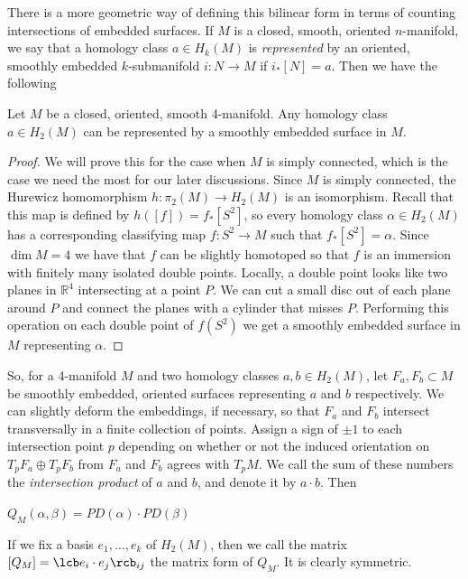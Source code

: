 There is a more geometric way of defining this bilinear form in terms of counting intersections of embedded surfaces. If $M$ is a closed, smooth, oriented $n$-manifold, we say that a homology class $a \in H_k(M)$ is \emph{represented} by an oriented, smoothly embedded $k$-submanifold $i : N \rightarrow M$ if $i_*[N] = a$. Then we have the following
\begin{lem}
\label{2nd homology classes represented by surfaces}
Let $M$ be a closed, oriented, smooth 4-manifold. Any homology class $a \in H_2(M)$ can be represented by a smoothly embedded surface in $M$.
\end{lem}
\begin{proof}
We will prove this for the case when $M$ is simply connected, which is the case we need the most for our later discussions. Since $M$ is simply connected, the Hurewicz homomorphism $h : \pi_2(M) \rightarrow H_2(M)$ is an isomorphism. Recall that this map is defined by $h([f]) = f_*[S^2]$, so every homology class $\alpha \in H_2(M)$ has a corresponding classifying map $f : S^2 \rightarrow M$ such that $f_*[S^2] = \alpha$. Since $\dim M = 4$ we have that $f$ can be slightly homotoped so that $f$ is an immersion with finitely many isolated double points. Locally, a double point looks like two planes in $\mathbb R^4$ intersecting at a point $P$. We can cut a small disc out of each plane around $P$ and connect the planes with a cylinder that misses $P$. Performing this operation on each double point of $f(S^2)$ we get a smoothly embedded surface in $M$ representing $\alpha$.
\end{proof}


So, for a 4-manifold $M$ and two homology classes $a,b \in H_2(M)$, let $F_a,F_b \subset M$ be smoothly embedded, oriented surfaces representing $a$ and $b$ respectively. We can slightly deform the embeddings, if necessary, so that $F_a$ and $F_b$ intersect transversally in a finite collection of points. Assign a sign of $\pm 1$ to each intersection point $p$ depending on whether or not the induced orientation on $T_p F_a \oplus T_p F_b$ from $F_a$ and $F_b$ agrees with $T_p M$. We call the sum of these numbers the \emph{intersection product} of $a$ and $b$, and denote it by $a \cdot b$. Then
\begin{prop}
$Q_M(\alpha,\beta) = PD(\alpha) \cdot PD(\beta)$
\end{prop}

If we fix a basis $e_1,\ldots,e_k$ of $H_2(M)$, then we call the matrix $[Q_M] = \lcb e_i \cdot e_j \rcb_{ij}$ the matrix form of $Q_M$. It is clearly symmetric.

